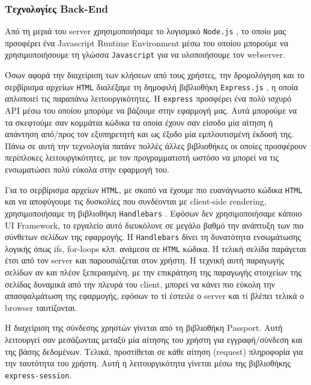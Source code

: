 \documentclass[nonacm, language=english, language=greek]{acmart}
\newcommand{\en}[1]{\textlatin{#1}}
\newcommand{\src}[1]{\texttt{\en{#1}}}
\begin{document}
\subsubsection{Τεχνολογίες \en{Back-End}}

Από τη μεριά του \en{server} χρησιμοποιήσαμε
το λογισμικό \src{Node.js} \cite{Node.js}, 
το οποίο μας πρσοφέρει ένα \en{Javascript Runtime Environment} μέσω 
του οποίου μπορούμε να χρησιμοποιήσουμε τη γλώσσα \src{Javascript} 
για να υλοποιήσουμε τον \en{webserver}.

Όσων αφορά την διαχείριση των κλήσεων από τους χρήστες, την δρομολόγηση 
και το σερβίρισμα αρχείων \src{HTML} διαλέξαμε τη δημοφιλή 
βιβλιοθήκη \src{Express.js} \cite{Express}, η οποία απλοποιεί 
τις παραπάνω λειτουργικότητες. Η \src{express} προσφέρει 
ένα πολύ ισχυρό \en{API} μέσω του οποίου μπορύμε να βάζουμε 
\say{\en{middlewares}} στην εφαρμογή μας. Αυτά μπορούμε να τα 
σκεφτούμε σαν κομμάτια κώδικα τα οποία έχουν σαν είσοδο μία αίτηση 
ή απάντηση από/προς τον εξυπηρετητή και ως έξοδο μία εμπλουτισμένη έκδοσή 
της. Πάνω σε αυτή την τεχνολογία πατάνε πολλές άλλες βιβλιοθήκες οι οποίες 
προσφέρουν περίπλοκες λειτουργικότητες, με τον προγραμματιστή ωστόσο 
να μπορεί να τις ενσωματώσει πολύ εύκολα στην εφαρμογή του.

Για το σερβίρισμα αρχείων \src{HTML}, με σκοπό να έχουμε 
πιο ευανάγνωστο κώδικα \src{HTML} και να αποφύγουμε τις δυσκολίες 
που συνδέονται με \en{client-side rendering}, χρησιμοποιήσαμε 
τη βιβλιοθήκη \src{Handlebars} \cite{Handlebars}. Εφόσων δεν 
χρησιμοποιήσαμε κάποιο \en{UI Framework}, το εργαλείο αυτό διευκόλυνε 
σε μεγάλο βαθμό την ανάπτυξη των πιο σύνθετων σελίδων της εφαρμογής.
Η \src{Handlebars} δίνει τη δυνατότητα ενσωμάτωσης λογικής 
όπως \en{ifs, for-loops} κλπ. ανάμεσα σε \src{HTML} κώδικα. 
Η τελική σελίδα παράγεται έτσι από τον \en{server} και παρουσιάζεται στον χρήστη.
Η τεχνική αυτή παραγωγής σελίδων αν και πλέον ξεπερασμένη, με την επικράτηση 
της παραγωγής στοιχείων της σελίδας δυναμικά από την πλευρά του \en{client}, μπορεί να κάνει 
πιο εύκολη την απασφαλμάτωση της εφαρμογής, εφόσων το τί έστειλε ο \en{server}
και τί βλέπει τελικά ο \en{browser} ταυτίζονται.

Η διαχείριση της σύνδεσης χρηστών γίνεται από τη βιβλιοθήκη \en{Passport}.
\cite{Passport} Αυτή λειτουργεί σαν μεσάζωντας μεταξύ μία αίτησης του χρήστη
για εγγραφή/σύνδεση και της βάσης δεδομένων. Τελικά, προστίθεται σε κάθε αίτηση
(\en{request}) πληροφορία για την ταυτότητα του χρήστη. Αυτή η λειτουργικότητα
γίνεται μέσω της βιβλιοθήκης \src{express-session}. 
\end{document}
